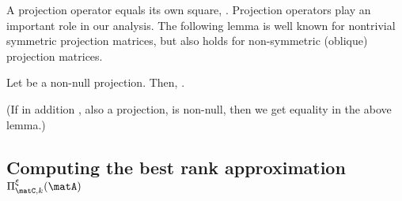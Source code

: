 A projection operator \math{\matP} equals
its own square, .
Projection operators play an important role in our analysis.
 The following lemma is well known
for nontrivial
symmetric projection matrices,
but also holds for non-symmetric (oblique) projection matrices.
\begin{lemma}\label{lemma:oblique}
Let \math{\matP} be a non-null projection. Then,
.
\end{lemma}
(If in addition \math{\matI-\matP}, also a projection,
is non-null, then we get equality in the
above lemma.)


\subsection{Computing the best rank  approximation
$\Pi_{\matC,k}^\xi(\matA)$} \label{sec:bestrankk}

